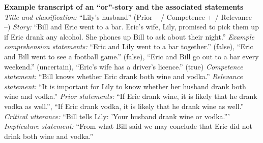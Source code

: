 \documentclass{sp}
\begin{document}
\begin{exe}
\ex	\textbf{Example transcript of an ``or''-story and the associated statements}\newline
\textit{Title and classification:} ``Lily's husband'' (Prior -- / Competence + / Relevance --)\newline
\textit{Story:} ``Bill and Eric went to a bar. Eric’s wife, Lily, promised to pick them up if Eric drank any alcohol. She phones up Bill to ask about their night.''\newline
\textit{Example comprehension statements:} ``Eric and Lily went to a bar together.'' (false), ``Eric and Bill went to see a football game.'' (false), ``Eric and Bill go out to a bar every weekend.'' (uncertain), ``Eric's wife has a driver’s licence.'' (true)\newline
\textit{Competence statement:} ``Bill knows whether Eric drank both wine and vodka.''\newline
\textit{Relevance statement:} ``It is important for Lily to know whether her husband drank both wine and vodka.''\newline
\textit{Prior statements:} ``If Eric drank wine, it is likely that he drank vodka as well.'', ``If Eric drank vodka, it is likely that he drank wine as well.''\newline
\textit{Critical utterance:} ``Bill tells Lily: 'Your husband drank wine or vodka.'''\newline
\textit{Implicature statement:} ``From what Bill said we may conclude that Eric did not drink both wine and vodka.''
\end{exe}
\end{document}
